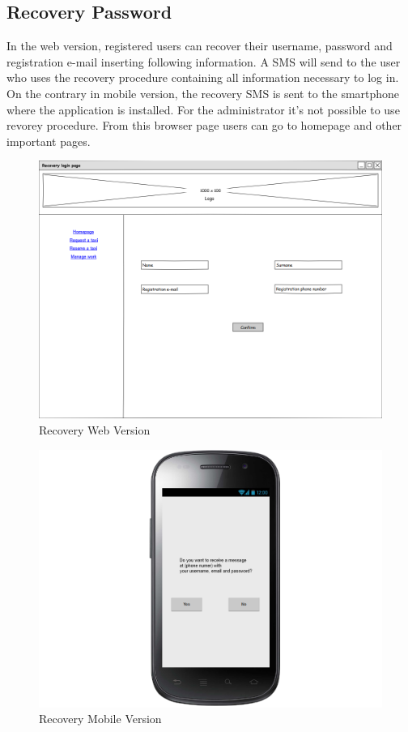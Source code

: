\subsection{Recovery Password}
In the web version, registered users can recover their username, password and registration e-mail inserting following information. A SMS will send to the user who uses the recovery procedure containing all information necessary to log in. \newline On the contrary in mobile version, the recovery SMS is sent to the smartphone where the application is installed. \newline For the administrator it's not possible to use revorey procedure. \newline From this browser page users can go to homepage and other important pages.  
\begin{figure}[H]
\centering
\includegraphics[scale=0.35]{mockups/recovery_login_page_web.png}
\caption{Recovery Web Version}
\end{figure}
\begin{figure}[H]
\centering
\includegraphics[scale=0.35]{mockups/recovery_login_mobile.png}
\caption{Recovery Mobile Version}
\end{figure}
\break
